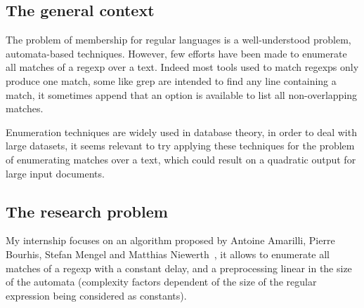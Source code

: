 \subsection*{The general context}


  The problem of membership for regular languages is a well-understood problem,
  automata-based techniques.   
  However, few efforts have been made to enumerate all matches of a regexp over
  a text. Indeed most tools used to match regexps only produce one match, some
  like grep are intended to find any line containing a match, it sometimes
  append  that an option is available to list all
  non-overlapping matches. 

  Enumeration techniques are widely used in database theory,  in order to deal
  with large datasets, it seems relevant to try applying these techniques for
  the problem of enumerating matches over a text, which could result on a
  quadratic output for large input documents. 

\subsection*{The research problem}


  My internship focuses on an algorithm proposed by Antoine Amarilli, Pierre
  Bourhis, Stefan Mengel and Matthias Niewerth~\cite{ICDT19}, it allows to
  enumerate all matches of a regexp with a constant delay, and a preprocessing
  linear in the size of the automata 
  (complexity factors dependent of the
  size of the regular expression being considered as constants).

